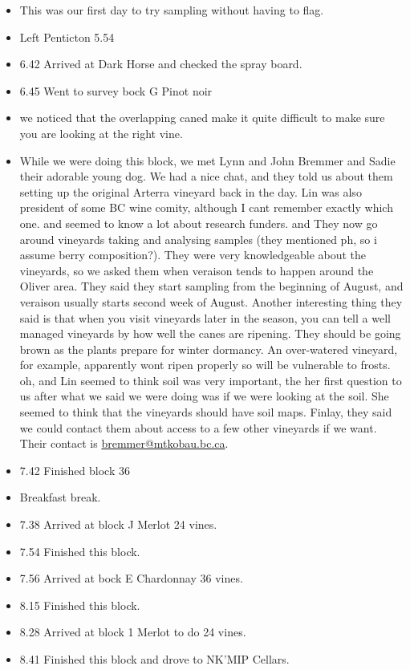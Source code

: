 \documentclass[11pt,letter]{article}
\newenvironment{smitemize}{
\begin{itemize}
  \setlength{\itemsep}{0pt}
  \setlength{\parskip}{0.8pt}
  \setlength{\parsep}{0pt}}
{\end{itemize}
}
\begin{document}
\begin{smitemize}
\item This was our first day to try sampling without having to flag. 
\item Left Penticton 5.54 
\item 6.42 Arrived at Dark Horse and checked the spray board.
\item 6.45 Went to survey bock G Pinot noir
\item we noticed that the overlapping caned make it quite difficult to make sure you are looking at the right vine.
\item While we were doing this block, we met Lynn and John Bremmer and Sadie their adorable young dog. We had a nice chat, and they told us about them setting up the original Arterra vineyard back in the day. Lin was also president of some BC wine comity, although I cant remember exactly which one. and seemed to know a lot about research funders. and They now go around vineyards taking and analysing samples (they mentioned ph, so i assume berry composition?). They were very knowledgeable about the vineyards, so we asked them when veraison tends to happen around the Oliver area. They said they start sampling from the beginning of August, and veraison usually starts second week of August. Another interesting thing they said is that when you visit vineyards later in the season, you can tell a well managed vineyards by how well the canes are ripening. They should be going brown as the plants prepare for winter dormancy. An over-watered vineyard, for example, apparently wont ripen properly so will be vulnerable to frosts. oh, and Lin seemed to think soil was very important, the her first question to us after what we said we were doing was if we were looking at the soil. She seemed to think that the vineyards should have soil maps. Finlay, they said we could contact them about access to a few other vineyards if we want. Their contact is  \href{mailto:bremmer@mtkobau.bc.ca}{bremmer@mtkobau.bc.ca}.
\item 7.42 Finished block 36
\item Breakfast break.
\item 7.38 Arrived at block J Merlot 24 vines.
\item 7.54 Finished this block. 
\item 7.56 Arrived at bock E Chardonnay 36 vines.
\item 8.15 Finished this block. 
\item 8.28 Arrived at block 1 Merlot to do 24 vines. 
\item 8.41 Finished this block and drove to NK'MIP Cellars.

\end{smitemize}
\end{document}
